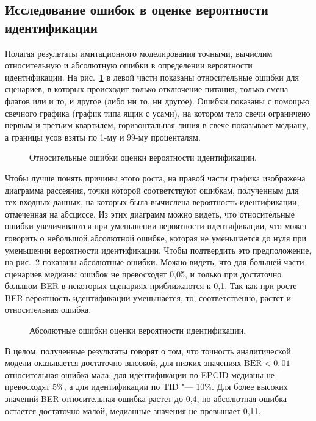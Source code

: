 \subsection{Исследование ошибок в оценке вероятности идентификации}

Полагая результаты имитационного моделирования точными, вычислим относительную и абсолютную ошибки в определении вероятности идентификации. На рис.~\ref{fig:ch3_results_rel_errors} в левой части показаны относительные ошибки для сценариев, в которых происходит только отключение питания, только смена флагов или и то, и другое (либо ни то, ни другое). Ошибки показаны с помощью свечного графика (график типа ящик с усами), на котором тело свечи ограничено первым и третьим квартилем, горизонтальная линия в свече показывает медиану, а границы усов взяты по 1-му и 99-му проценталям.

\begin{figure}[htb]
  \caption{Относительные ошибки оценки вероятности идентификации.}
  \label{fig:ch3_results_rel_errors}
\end{figure}

Чтобы лучше понять причины этого роста, на правой части графика изображена диаграмма рассеяния, точки которой соответствуют ошибкам, полученным для тех входных данных, на которых была вычислена вероятность идентификации, отмеченная на абсциссе. Из этих диаграмм можно видеть, что относительные ошибки увеличиваются при уменьшении вероятности идентификации, что может говорить о небольшой абсолютной ошибке, которая не уменьшается до нуля при уменьшении вероятности идентификации. Чтобы подтвердить это предположение, на рис.~\ref{fig:ch3_results_abs_errors} показаны абсолютные ошибки. Можно видеть, что для большей части сценариев медианы ошибок не превосходят 0,05, и только при достаточно большом BER в некоторых сценариях приближаются к 0,1. Так как при росте BER вероятность идентификации уменьшается, то, соответственно, растет и относительная ошибка.


\begin{figure}[htb]
  \caption{Абсолютные ошибки оценки вероятности идентификации.}
  \label{fig:ch3_results_abs_errors}
\end{figure}

В целом, полученные результаты говорят о том, что точность аналитической модели оказывается достаточно высокой, для низких значениях $\text{BER} < 0,01$ относительная ошибка мала: для идентификации по EPCID медианы не превосходят 5\%, а для идентификации по TID "--- 10\%. Для более высоких значений BER относительная ошибка растет до 0,4, но абсолютная ошибка остается достаточно малой, медианные значения не превышает 0,11.



